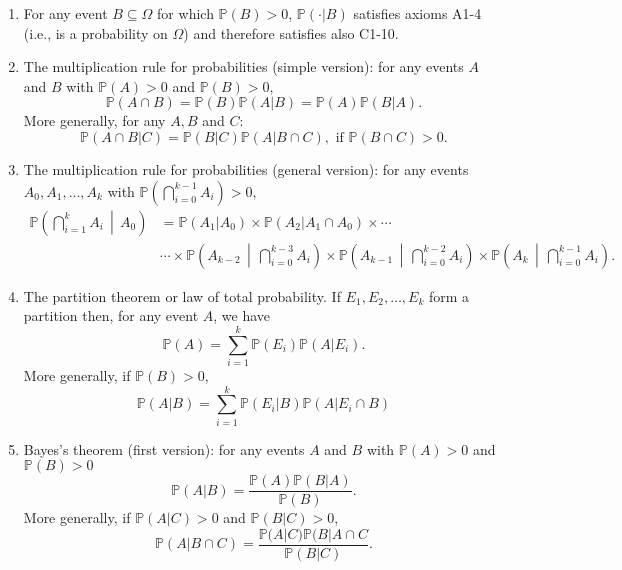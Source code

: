 \documentclass[10pt, a4paper]{article}
\newcommand{\Po}{\mathbb{P}}
\begin{document}
\begin{enumerate}[label = P\arabic*]
    \item For any event $B \subseteq \Omega$ for which $\Po (B) > 0$, $\Po(\cdot | B)$ satisfies axioms A1-4 (i.e., is a probability on $\Omega$) and therefore satisfies also C1-10.

    \item The multiplication rule for probabilities (simple version): for any events $A$ and $B$ with $\Po (A) > 0$ and $\Po(B) > 0$,
    \[
    \Po (A \cap B) = \Po (B) \Po(A | B) = \Po(A) \Po(B | A).
    \]
    More generally, for any $A, B$ and $C$:
    \[
    \Po(A \cap B | C) = \Po(B | C) \Po(A | B \cap C),\text{ if } \Po(B \cap C) > 0.
    \]

    \item The multiplication rule for probabilities (general version): for any events $A_0, A_1, \dotsc, A_k$ with $\Po\left(\bigcap_{i = 0}^{k - 1}A_i\right) > 0$,
    \begin{align*}
    \Po\left(\bigcap_{i = 1}^{k}A_i \,\middle|\, A_0\right) &= \Po(A_1 | A_0) \times \Po(A_2 | A_1 \cap A_0) \times \dotsi \\
    &\dotsi\times \Po\left(A_{k - 2} \,\middle|\, \bigcap_{i = 0}^{k - 3}A_i\right) \times \Po\left(A_{k - 1} \,\middle|\, \bigcap_{i = 0}^{k - 2}A_i\right) \times \Po\left(A_{k} \,\middle|\, \bigcap_{i = 0}^{k - 1}A_i\right).
    \end{align*}
    \item The partition theorem or law of total probability. If $E_1, E_2, \dotsc, E_k$ form a partition then, for any event $A$, we have
    \[
    \Po(A) = \sum_{i = 1}^{k}\Po(E_i)\Po(A | E_i).
    \]
    More generally, if $\Po(B) > 0$,
    \[
    \Po(A | B) = \sum_{i = 1}^{k}\Po(E_i | B)\Po(A | E_i \cap B)
    \]
    \item Bayes's theorem (first version): for any events $A$ and $B$ with $\Po(A) > 0$ and $\Po(B) > 0$
    \[
    \Po(A | B) = \frac{\Po(A)\Po(B | A)}{\Po(B)}.
    \]
    More generally, if $\Po(A | C) > 0$ and $\Po(B | C) > 0$,
    \[
    \Po(A | B \cap C) = \frac{\Po(A | C)\Po(B | A \cap C}{\Po(B | C)}.
    \]
\end{enumerate}
\end{document}
